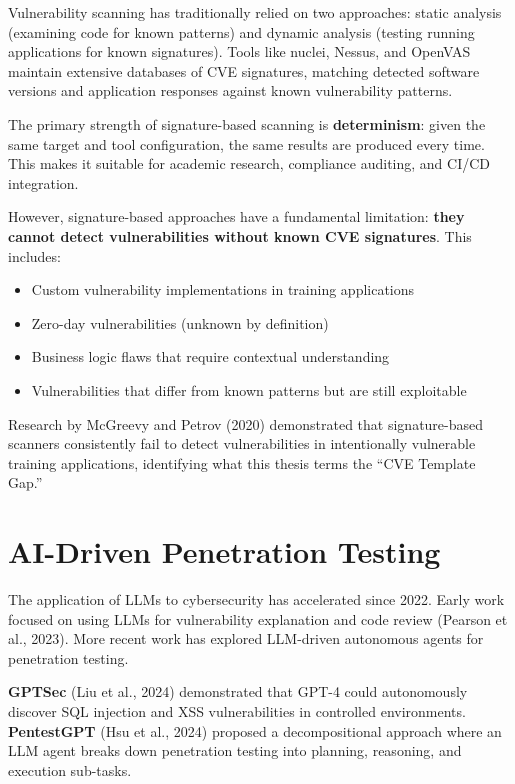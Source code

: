 \documentclass[12pt,a4paper,oneside]{book}
\begin{document}
Vulnerability scanning has traditionally relied on two approaches: static analysis (examining code for known patterns) and dynamic analysis (testing running applications for known signatures). Tools like nuclei, Nessus, and OpenVAS maintain extensive databases of CVE signatures, matching detected software versions and application responses against known vulnerability patterns.

The primary strength of signature-based scanning is \textbf{determinism}: given the same target and tool configuration, the same results are produced every time. This makes it suitable for academic research, compliance auditing, and CI/CD integration.

However, signature-based approaches have a fundamental limitation: \textbf{they cannot detect vulnerabilities without known CVE signatures}. This includes:
\begin{itemize}
    \item Custom vulnerability implementations in training applications
    \item Zero-day vulnerabilities (unknown by definition)
    \item Business logic flaws that require contextual understanding
    \item Vulnerabilities that differ from known patterns but are still exploitable
\end{itemize}

Research by McGreevy and Petrov (2020) demonstrated that signature-based scanners consistently fail to detect vulnerabilities in intentionally vulnerable training applications, identifying what this thesis terms the ``CVE Template Gap.''

\section{AI-Driven Penetration Testing}

The application of LLMs to cybersecurity has accelerated since 2022. Early work focused on using LLMs for vulnerability explanation and code review (Pearson et al., 2023). More recent work has explored LLM-driven autonomous agents for penetration testing.

\textbf{GPTSec} (Liu et al., 2024) demonstrated that GPT-4 could autonomously discover SQL injection and XSS vulnerabilities in controlled environments. \textbf{PentestGPT} (Hsu et al., 2024) proposed a decompositional approach where an LLM agent breaks down penetration testing into planning, reasoning, and execution sub-tasks.
\end{document}

